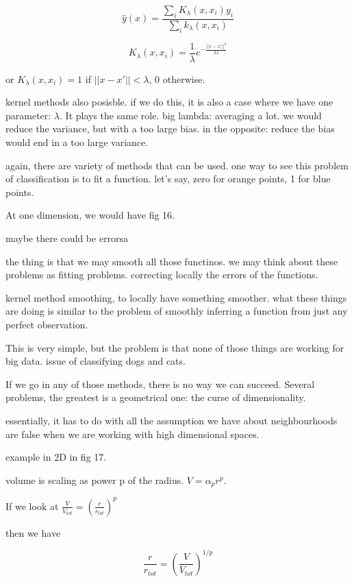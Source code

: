 \documentclass[a4paper]{tufte-book}
\begin{document}
\begin{equation}
    \hat y(x) = \frac{\sum_i K_\lambda (x,x_i)y_i}{\sum_i k_\lambda (x,x_i)}
\end{equation}

\begin{equation}
    K_\lambda (x,x_i) = \frac{1}{\lambda} e^{-\frac{||x-x'||^2}{2\lambda}}
\end{equation}

or $K_\lambda (x,x_i) = 1$ if $||x-x'||<\lambda$, 0 otherwise.

kernel methods also posisble.
if we do this, it is also a case where we have one parameter: $\lambda$. It plays
the same role.
big lambda: averaging a lot.
we would reduce the variance, but with a too large bias.
in the opposite: reduce the bias would end in a too large variance.

again, there are variety of methods that can be used. one way to see this
problem of classification is to fit a function.
let's say, zero for orange points, 1 for blue points.

At one dimension, we would have
fig 16.

maybe there could be errorsa

the thing is that we may smooth all those functinos.
we may think about these problems as fitting problems. correcting locally
the errors of the functions.

kernel method smoothing, to locally have something smoother.
what these things are doing is similar to the problem of smoothly inferring a
function from just any perfect observation.

This is very simple, but the problem is that none of those things are working
for big data. issue of classifying dogs and cats.

If we go in any of those methods, there is no way we can succeed. Several
problems, the greatest is a geometrical one:
the curse of dimensionality.

essentially, it has to do with all the assumption we have about neighbourhoods
are false when we are working with high dimensional spaces.

example in 2D in fig 17.

volume is scaling as power p of the radius. $V = \alpha_p r^p$.

If we look at $\frac{V}{V_{tot}} = \left( \frac{r}{r_{tot}} \right)^p$

then we have 

\begin{equation}
    \frac{r}{r_{tot}} = \left( \frac{V}{V_{tot}} \right)^{1/p}
\end{equation}
\end{document}
